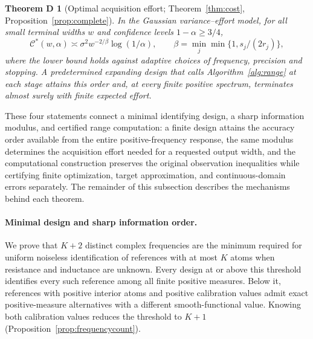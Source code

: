 \documentclass[10pt]{amsart}
\theoremstyle{definition}
\theoremstyle{remark}
\theoremstyle{plain}
\newtheorem*{mainD}{Theorem D}
\begin{document}
\begin{mainD}[Optimal acquisition effort; Theorem~\ref{thm:cost}, Proposition~\ref{prop:complete}]
In the Gaussian variance--effort model, for all small terminal widths $w$ and confidence levels $1-\alpha\ge3/4$,
\[
 \mathcal C^*(w,\alpha)\asymp\sigma^2w^{-2/\beta}\log(1/\alpha),\qquad \beta=\min_j\min\{1,s_j/(2r_j)\},
\]
where the lower bound holds against adaptive choices of frequency, precision and stopping. A predetermined expanding design that calls Algorithm~\ref{alg:range} at each stage attains this order and, at every finite positive spectrum, terminates almost surely with finite expected effort.
\end{mainD}

These four statements connect a minimal identifying design, a sharp information modulus, and certified range computation: a finite design attains the accuracy order available from the entire positive-frequency response, the same modulus determines the acquisition effort needed for a requested output width, and the computational construction preserves the original observation inequalities while certifying finite optimization, target approximation, and continuous-domain errors separately. The remainder of this subsection describes the mechanisms behind each theorem.

\paragraph{Minimal design and sharp information order.}
We prove that $K+2$ distinct complex frequencies are the minimum required for uniform noiseless identification of references with at most $K$ atoms when resistance and inductance are unknown. Every design at or above this threshold identifies every such reference among all finite positive measures. Below it, references with positive interior atoms and positive calibration values admit exact positive-measure alternatives with a different smooth-functional value. Knowing both calibration values reduces the threshold to $K+1$ (Proposition~\ref{prop:frequencycount}).
\end{document}
